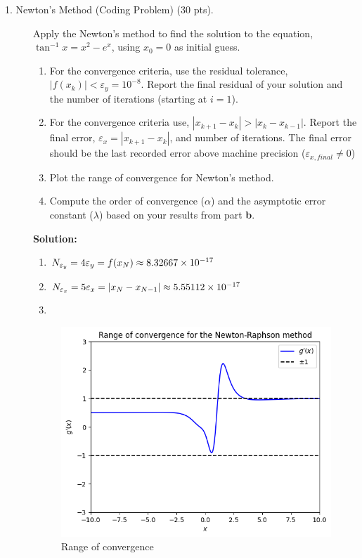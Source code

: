 \documentclass[12pt]{article}
\begin{document}
\begin{description}
\item[1. Newton's Method \color{red} (Coding Problem) \color{black} (30 pts).] Apply the Newton's method to find the solution to the equation, $\tan^{-1} x = x^2 - e^{x}$, using $x_0 = 0$ as initial guess.
\begin{enumerate}[label=\textbf{(\alph*)}]
    \item For the convergence criteria, use the residual tolerance, $| f(x_k) | < \varepsilon_y = 10^{-8}$. Report the final residual of your solution and the number of iterations (starting at $i = 1$).
    \item For the convergence criteria use, $| x_{k+1} - x_k | > | x_k - x_{k-1} |$. Report the final error, $\varepsilon_x = | x_{k+1} - x_k |$, and number of iterations. The final error should be the last recorded error above machine precision ($\varepsilon_{x,final} \neq 0$)
    \item Plot the range of convergence for Newton's method.
    \item Compute the order of convergence ($\alpha$) and the asymptotic error constant ($\lambda$) based on your results from part \textbf{b}.
\end{enumerate}

\ifsolution
\color{red}
\textbf{Solution:} \\
\begin{enumerate}[label=\textbf{(\alph*)}]
    \item $N_{\varepsilon_{y}} = 4 \\
    \varepsilon_{y} = f(x_N) \approx 8.32667 \times 10^{-17}$ \\
    \item $N_{\varepsilon_{x}} = 5 \\
    \varepsilon_{x} = \left|x_{N}-x_{N-1}\right| \approx 5.55112 \times 10^{-17}$ \\
    \item
\end{enumerate}
\begin{figure}[H]
    \centering\includegraphics[width=4.5in]{HW2-P1.PNG}
    \caption{Range of convergence}
    \label{fig:Convergence}
\end{figure}


\end{description}
\end{document}
